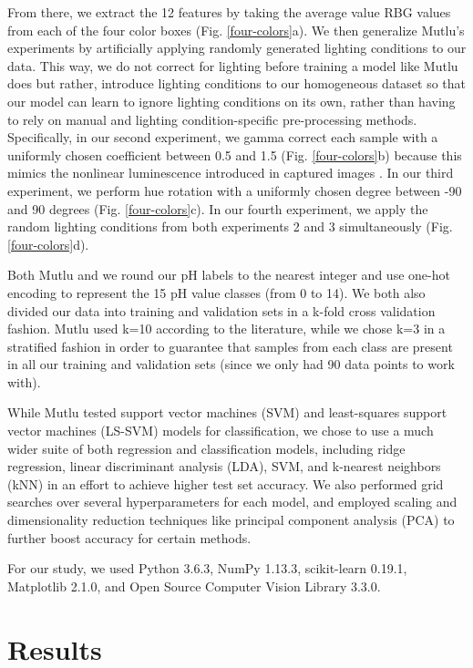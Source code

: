 \documentclass[journal]{IEEEtran}
\begin{document}
From there, we extract the 12 features by taking the average value RBG values from each of the four color boxes (Fig. \ref{four-colors}a). We then generalize Mutlu’s experiments by artificially applying randomly generated lighting conditions to our data. This way, we do not correct for lighting before training a model like Mutlu does but rather, introduce lighting conditions to our homogeneous dataset so that our model can learn to ignore lighting conditions on its own, rather than having to rely on manual and lighting condition-specific pre-processing methods. Specifically, in our second experiment, we gamma correct each sample with a uniformly chosen coefficient between 0.5 and 1.5 (Fig. \ref{four-colors}b) because this mimics the nonlinear luminescence introduced in captured images \cite{farid}. In our third experiment, we perform hue rotation with a uniformly chosen degree between -90 and 90 degrees (Fig. \ref{four-colors}c). In our fourth experiment, we apply the random lighting conditions from both experiments 2 and 3 simultaneously (Fig. \ref{four-colors}d).

Both Mutlu and we round our pH labels to the nearest integer and use one-hot encoding to represent the 15 pH value classes (from 0 to 14). We both also divided our data into training and validation sets in a k-fold cross validation fashion. Mutlu used k=10 according to the literature, while we chose k=3 in a stratified fashion in order to guarantee that samples from each class are present in all our training and validation sets (since we only had 90 data points to work with).

While Mutlu tested support vector machines (SVM) and least-squares support vector machines (LS-SVM) models for classification, we chose to use a much wider suite of both regression and classification models, including ridge regression, linear discriminant analysis (LDA), SVM, and k-nearest neighbors (kNN) in an effort to achieve higher test set accuracy. We also performed grid searches over several hyperparameters for each model, and employed scaling and dimensionality reduction techniques like principal component analysis (PCA) to further boost accuracy for certain methods.

For our study, we used Python 3.6.3, NumPy 1.13.3, scikit-learn 0.19.1, Matplotlib 2.1.0, and Open Source Computer Vision Library 3.3.0.

\section{Results}
\end{document}
